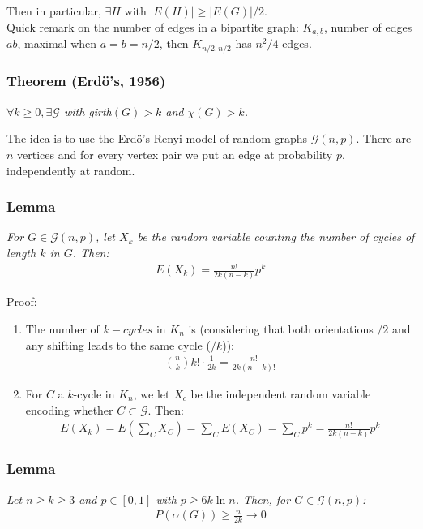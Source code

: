 \documentclass[11pt]{book}
\begin{document}
Then in particular, $\exists H$ with $|E(H)| \geq |E(G)|/2$.\\

Quick remark on the number of edges in a bipartite graph: $K_{a,b}$, number of edges $ab$, maximal when $a = b = n/2$, then $K_{n/2, n/2}$ has $n^2/4$ edges.

\subsubsection{Theorem (Erdö's, 1956)}
\textit{$\forall k \geq 0, \exists \mathcal{G}$ with girth$(G) > k$ and $\chi(G) > k$.\\}

The idea is to use the Erdö's-Renyi model of random graphs $\mathcal{G}(n,p)$. There are $n$ vertices and for every vertex pair we put an edge at probability $p$, independently at random. 

\subsubsection{Lemma}
\textit{For $G \in \mathcal{G}(n,p)$, let $X_k$ be the random variable counting the number of cycles of length $k$ in $G$. Then:}
\begin{eqnarray}
	E(X_k) = \frac{n!}{2k(n-k)} p^k
\end{eqnarray}

Proof:
\begin{enumerate}
	\item The number of $k-cycles$ in $K_n$ is (considering that both orientations $/2$ and any shifting leads to the same cycle ($/k$)):
	\begin{eqnarray}
		{{n}\choose{k}} k! \cdot \frac{1}{2k} = \frac{n!}{2k(n-k)!}
	\end{eqnarray}
	\item For $C$ a $k$-cycle in $K_n$, we let $X_c$ be the independent random variable encoding whether $C \subset \mathcal{G}$. Then:
	\begin{eqnarray}
		E(X_k) = E(\sum_C X_C) = \sum_C E(X_C) = \sum_C p^k = \frac{n!}{2k(n-k)} p^k
	\end{eqnarray}
\end{enumerate}

\subsubsection{Lemma}
\textit{Let $n \geq k \geq 3$ and $p \in [0,1]$ with $p \geq 6k \ln n$. Then, for $G \in \mathcal{G}(n,p)$:}
\begin{eqnarray}
	P(\alpha(G)) \geq \frac{n}{2k} \rightarrow 0
\end{eqnarray}
\end{document}
